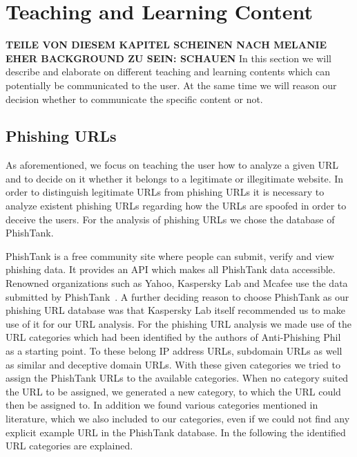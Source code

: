 \section{Teaching and Learning Content}

\textbf{TEILE VON DIESEM KAPITEL SCHEINEN NACH MELANIE EHER BACKGROUND ZU SEIN: SCHAUEN}
In this section we will describe and elaborate on different teaching and learning contents which can potentially be communicated to the user.
 At the same time we will reason our decision whether to communicate the specific content or not.

\subsection{Phishing URLs}
As aforementioned, we focus on teaching the user how to analyze a given URL and to decide on it whether it belongs to a legitimate or illegitimate website.
 In order to distinguish legitimate URLs from phishing URLs it is necessary to analyze existent phishing URLs regarding how the URLs are spoofed in order to deceive the users.
 For the analysis of phishing URLs we chose the database of PhishTank.

PhishTank is a free community site where people can submit, verify and view phishing data.
 It provides an API which makes all PhishTank data accessible.
 Renowned organizations such as Yahoo, Kaspersky Lab and Mcafee use the data submitted by PhishTank~\cite{phishtank}. A further deciding reason to choose PhishTank as our phishing URL database was that Kaspersky Lab itself recommended us to make use of it for our URL analysis.
 For the phishing URL analysis we made use of the URL categories which had been identified by the authors of Anti-Phishing Phil~\cite{sheng2007antiphishingphil} as a starting point.
 To these belong IP address URLs, subdomain URLs as well as similar and deceptive domain URLs.
 With these given categories we tried to assign the PhishTank URLs to the available categories.
 When no category suited the URL to be assigned, we generated a new category, to which the URL could then be assigned to.
 In addition we found various categories mentioned in literature, which we also included to our categories, even if we could not find any explicit example URL in the PhishTank database.
 In the following the identified URL categories are explained.



